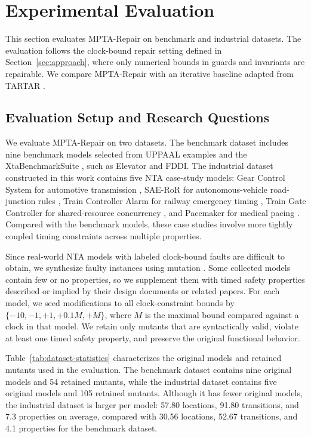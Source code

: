 \section{Experimental Evaluation}
\label{sec:evaluation}

This section evaluates MPTA-Repair on benchmark and industrial
datasets. The evaluation follows the clock-bound repair setting
defined in Section~\ref{sec:approach}, where only numerical bounds in
guards and invariants are repairable. We compare MPTA-Repair with an
iterative baseline adapted from TARTAR
\cite{kolbl2019clock}.

\subsection{Evaluation Setup and Research Questions}

We evaluate MPTA-Repair on two datasets. The benchmark dataset includes
nine benchmark models selected from UPPAAL examples
\cite{behrmann2004tutorial} and the XtaBenchmarkSuite
\cite{farkas2018benchmarks}, such as Elevator and FDDI. The industrial
dataset constructed in this work contains five NTA
case-study models: Gear Control System for automotive transmission
\cite{lindahl1998gear}, SAE-RoR for autonomous-vehicle road-junction rules
\cite{alves2021double}, Train Controller Alarm for railway emergency
timing \cite{gonzalez2024uppaal}, Train Gate Controller for
shared-resource concurrency \cite{alur1994theory}, and Pacemaker for
medical pacing \cite{jiang2010heart}. Compared with the benchmark
models, these case studies involve more tightly coupled timing
constraints across multiple properties.

Since real-world NTA models with labeled clock-bound faults are
difficult to obtain, we synthesize faulty instances using mutation
\cite{jia2011mutation}. Some collected models contain few or no
properties, so we supplement them with timed safety properties described
or implied by their design documents or related papers. For each model,
we seed modifications to all clock-constraint bounds by
$\{-10,-1,+1,+0.1M,+M\}$, where $M$ is the maximal bound compared
against a clock in that model. We retain only mutants that are
syntactically valid, violate at least one timed safety property, and
preserve the original functional behavior.



Table~\ref{tab:dataset-statistics} characterizes the original models
and retained mutants used in the evaluation. The benchmark dataset
contains nine original models and 54 retained mutants, while the
industrial dataset contains five original models and 105 retained
mutants. Although it has fewer original models, the industrial dataset
is larger per model: 57.80 locations, 91.80 transitions, and 7.3
properties on average, compared with 30.56 locations, 52.67
transitions, and 4.1 properties for the benchmark dataset.

